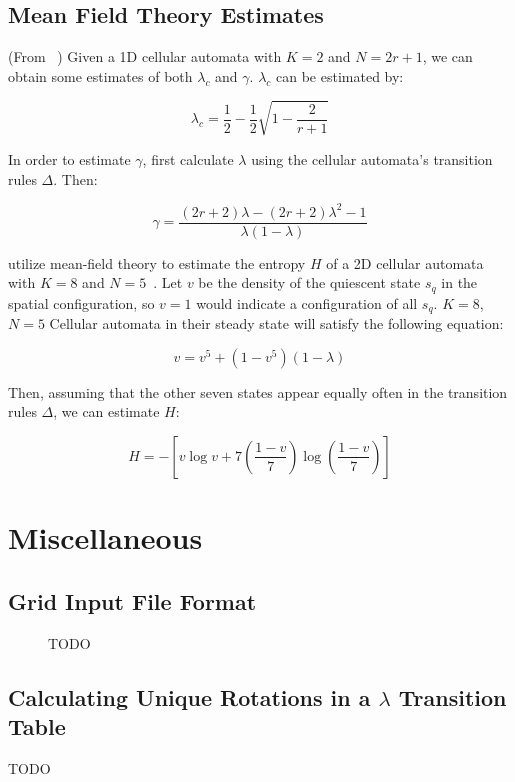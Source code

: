 \documentclass[a4paper,11pt]{report}
\begin{document}
\begin{appendices}
\section{Mean Field Theory Estimates}
\label{appA:MFT}
(From \citeauthor{li90b}~\cite{li90b}) Given a 1D cellular automata with $K=2$ and $N = 2r+1$, we can obtain some estimates of both $\lambda_c$ and $\gamma$. $\lambda_c$ can be estimated by:

\begin{equation}
\lambda_c = \frac{1}{2} - \frac{1}{2}\sqrt{1 - \frac{2}{r+1}}
\end{equation}

In order to estimate $\gamma$, first calculate $\lambda$ using the cellular automata's transition rules $\Delta$. Then:

\begin{equation}
\gamma = \frac{(2r+2)\lambda - (2r + 2)\lambda^2 - 1}{\lambda(1-\lambda)}
\end{equation}

\pagebreak

\citeauthor{wo90} utilize mean-field theory to estimate the entropy $H$ of a 2D cellular automata with $K=8$ and $N=5$~\cite{wo90}. Let $v$ be the density of the quiescent state $s_q$ in the spatial configuration, so $v=1$ would indicate a configuration of all $s_q$. $K=8$, $N=5$ Cellular automata in their steady state will satisfy the following equation:

\begin{equation}
v = v^5 + (1 - v^5)(1- \lambda)
\end{equation}

Then, assuming that the other seven states appear equally often in the transition rules $\Delta$, we can estimate $H$:

\begin{equation}
H = -\left[ v \log v + 7\left(\frac{1-v}{7}\right)\log\left(\frac{1-v}{7}\right)\right]
\end{equation}

\chapter{Miscellaneous}
\section{Grid Input File Format}
\label{appB:grid_in}
\begin{figure}
\centering
\caption[Canonical Grid Data File]{
	TODO
}
\label{fig:gridfile}
\end{figure}

\section{Calculating Unique Rotations in a $\lambda$ Transition Table}
\label{appB:rot}
TODO
\processdelayedfloats
\end{appendices}



\end{document}

